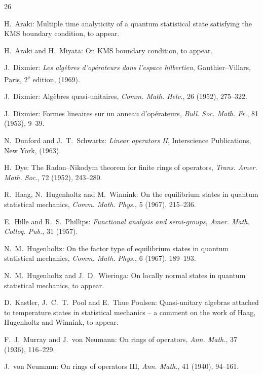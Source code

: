\documentclass[12pt,b5paper,twoside]{article}
\theoremstyle{takesaki}
\numberwithin{equation}{section}
\begin{document}
\clearpage
{}
{}
\begin{thebibliography}{26}

H.~Araki:
Multiple time analyticity of a quantum statistical state satisfying the
KMS boundary condition, to appear.

H.~Araki and H.~Miyata:
On KMS boundary condition, to appear.

J.~Dixmier:
\emph{Les alg\`ebres d'op\'erateurs dans l'espace hilbertien},
Gauthier--Villars, Paris, 2\textsuperscript{e} edition, (1969).

J.~Dixmier:
Alg\`ebres quasi-unitaires, \emph{Comm. Math. Helv.}, 26 (1952),
275--322.

J.~Dixmier:
Formes lineaires sur un anneau d'op\'erateurs,
\emph{Bull. Soc. Math. Fr.}, 81 (1953), 9--39.

N.~Dunford and J.~T.~Schwartz:
\emph{Linear operators II}, Interscience Publications, New York, (1963).

H.~Dye:
The Radon--Nikodym theorem for finite rings of operators,
\emph{Trans. Amer. Math. Soc.}, 72 (1952), 243--280.

R.~Haag, N.~Hugenholtz and M.~Winnink:
On the equilibrium states in quantum statistical mechanics,
\emph{Comm. Math. Phys.}, 5 (1967), 215--236.

E.~Hille and R.~S.~Phillips:
\emph{Functional analysis and semi-groups},
\emph{Amer. Math. Colloq. Pub.}, 31 (1957).

N.~M.~Hugenholtz:
On the factor type of equilibrium states in quantum statistical mechanics,
\emph{Comm. Math. Phys.}, 6 (1967), 189--193.

N.~M.~Hugenholtz and J.~D.~Wieringa:
On locally normal states in quantum statistical mechanics, to appear.

D.~Kastler, J.~C.~T.~Pool and E.~Thue Poulsen:
Quasi-unitary algebras attached to temperature states in statistical
mechanics -- a comment on the work of Haag, Hugenholtz and Winnink,
to appear.

F.~J.~Murray and J.~von Neumann:
On rings of operators, \emph{Ann. Math.}, 37 (1936), 116--229.

J.~von Neumann:
On rings of operators III, \emph{Ann. Math.}, 41 (1940), 94--161.


\end{thebibliography}
\end{document}
